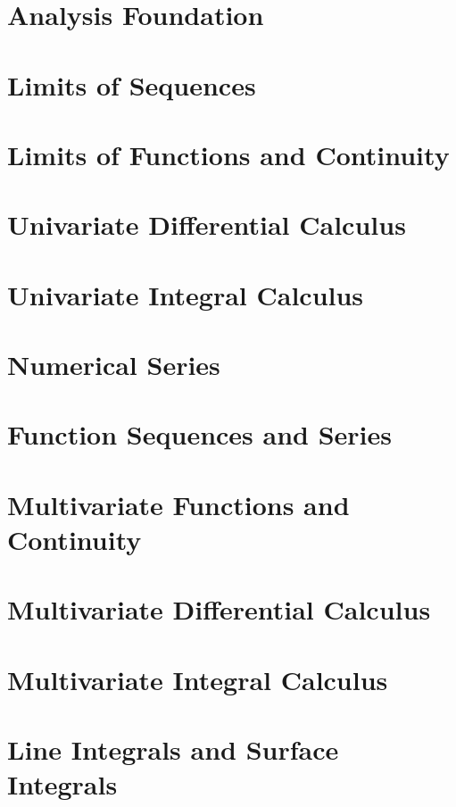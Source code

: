 \documentclass{report}
\begin{document}
	
	\thispagestyle{empty}
	\newpage%
	\tableofcontents
  

  \chapter{Analysis Foundation}
  
  \chapter{Limits of Sequences}
  
  \chapter{Limits of Functions and Continuity}
  
  \chapter{Univariate Differential Calculus}
  
  \chapter{Univariate Integral Calculus}
  
  \chapter{Numerical Series}
  
  \chapter{Function Sequences and Series}
  
  \chapter{Multivariate Functions and Continuity}
  
  \chapter{Multivariate Differential Calculus}
  
  \chapter{Multivariate Integral Calculus}
  
  \chapter{Line Integrals and Surface Integrals}
  



  
\end{document}
